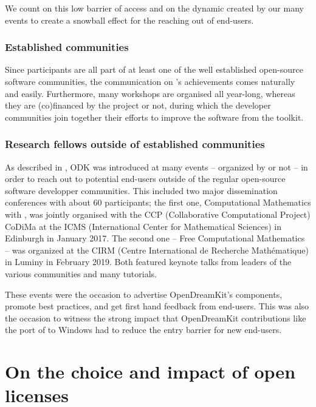 \documentclass{deliverablereport}
\begin{document}
We count on this low barrier of access and on the dynamic created by
our many events to create a snowball effect for the reaching out of
end-users.

\subsubsection{Established communities}

Since \ODK participants are all part of at least one of the well established open-source software communities, the communication on \ODK's achievements comes naturally and easily. Furthermore, many workshops are organised all year-long, whereas they are (co)financed by the project or not, during which the developer communities join together their efforts to improve the software from the \ODK toolkit.

\subsubsection{Research fellows outside of established communities}

As described in 
 ,
ODK was introduced at many events -- organized by \ODK or not -- in
order to reach out to potential end-users outside of the regular
open-source software developper communities. This included two major
dissemination conferences with about 60 participants; the first one,
Computational Mathematics with \Jupyter, was jointly organised with the
CCP (Collaborative Computational Project) CoDiMa at the ICMS
(International Center for Mathematical Sciences) in Edinburgh in
January 2017. The second one -- Free Computational Mathematics -- was
organized at the CIRM (Centre International de Recherche Mathématique)
in Luminy in February 2019. Both featured keynote talks from leaders
of the various communities and many tutorials.

These events were the occasion to advertise OpenDreamKit's components,
promote best practices, and get first hand feedback from end-users.
This was also the occasion to witness the strong impact that
OpenDreamKit contributions like the port of \Sage to Windows had to
reduce the entry barrier for new end-users.

\section{On the choice and impact of open licenses}
\end{document}
